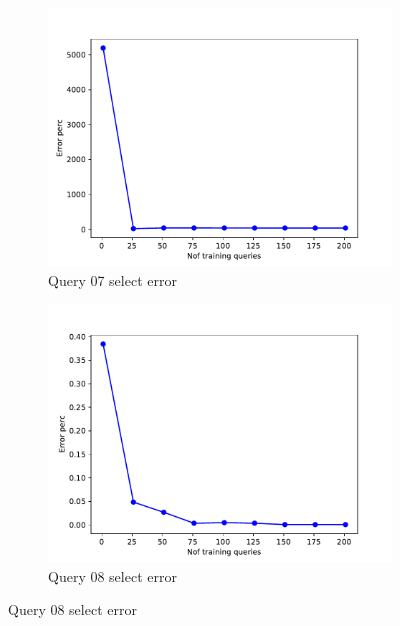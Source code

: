 \begin{figure}[!htb]
     \begin{subfigure}[t]{0.5\textwidth}
       \includegraphics[scale=0.4]{figs/tpch10/tpch10_sel07_error.pdf}
       \caption{Query 07 select error}
       \label{fig:tpch_sel07}
     \end{subfigure}
     \begin{subfigure}[t]{0.5\textwidth}
       \includegraphics[scale=0.4]{figs/tpch10/tpch10_sel08_error.pdf}
       \caption{Query 08 select error}
       \label{fig:tpch_sel08}
      \end{subfigure}
\end{figure}

